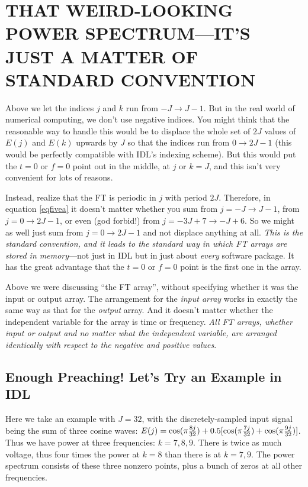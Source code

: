 \documentclass[psfig,preprint]{aastex}
\begin{document}
\section{THAT WEIRD-LOOKING POWER SPECTRUM---IT'S JUST A MATTER OF 
STANDARD CONVENTION}

          Above we let the indices $j$ and $k$ run from $-J \rightarrow
J-1$.  But in the real world of numerical computing, we don't use
negative indices.  You might think that the reasonable way to handle
this would be to displace the whole set of $2J$ values of $E(j)$ and
$E(k)$ upwards by $J$ so that the indices run from $0 \rightarrow 2J-1$
(this would be perfectly compatible with IDL's indexing scheme).  But
this would put the $t=0$ or $f=0$ point out in the middle, at $j$ or
$k=J$, and this isn't very convenient for lots of reasons. 

          Instead, realize that the FT is periodic in $j$ with period
$2J$.  Therefore, in equation \ref{eqfivea} it doesn't matter whether you sum from
$j = -J \to J-1$, from $j = 0 \to 2J-1$, or even (god forbid!) from $j =
-3J + 7 \to -J + 6$.  So we might as well just sum from $j = 0 \to 2J-1$
and not displace anything at all.  {\it This is the standard convention,
and it leads to the standard way in which FT arrays are stored in
memory}---not just in IDL but in just about {\it every} software
package.  It has the great advantage that the $t=0$ or $f=0$ point is
the first one in the array. 

          Above we were discussing ``the FT array'', without specifying
whether it was the input or output array.  The arrangement for the {\it
input array} works in exactly the same way as that for the {\it output}
array.  And it doesn't matter whether the independent variable for the
array is time or frequency.  {\it All FT arrays, whether input or output
and no matter what the independent variable, are arranged {\it
identically} with respect to the negative and positive values}. 

\subsection{ Enough Preaching! Let's Try an Example in IDL}

	Here we take an example with $J=32$, with the discretely-sampled
input signal being the sum of three cosine waves: $E(j) = \cos(\pi {8j
\over 32}) + 0.5[\cos(\pi {7j \over 32}) + \cos(\pi {9j \over 32})]$. 
Thus we have power at three frequencies: $k=7, 8, 9$.  There is twice as
much voltage, thus four times the power at $k=8$ than there is at $k=7,
9$.  The power spectrum consists of these three nonzero points, plus a
bunch of zeros at all other frequencies.
\end{document}
